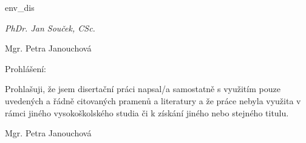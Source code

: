 \environment env_dis

\setuppagenumbering[state=stop,location=]
\setupheadertexts[]


\startfrontmatter[page=no]


\vfill

{\tfb\em%
PhDr. Jan Souček, CSc.

\blank

\currentdate[year] \hfill Mgr. Petra Janouchová}


\vfill

\page

\strut

{\setupindenting[no]
\vfill

{\tf Prohlášení:}

{\tf Prohlašuji, že jsem disertační práci napsal/a samostatně s využitím pouze uvedených a řádně citovaných pramenů a literatury a že práce nebyla využita v rámci jiného vysokoškolského studia či k získání jiného nebo stejného titulu.}


{\hfill\tf Mgr. Petra Janouchová}  
}


\stopfrontmatter
